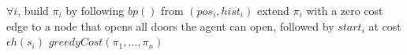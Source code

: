 \documentclass[letterpaper]{article}
\begin{document}
\begin{algorithm}
\caption{$jointPriority((pos_1,hist_1),\ldots,(pos_N,hist_N))$}
\label{alg:update}
\begin{algorithmic}
\STATE $\forall i$, build $\pi_i$ by following $bp()$ from $(pos_i, hist_i)$
\STATE extend $\pi_i$ with a zero cost edge to a node that opens all doors the agent can open, followed by $start_i$ at cost $\epsilon h(s_i)$
\ENDFOR
\RETURN $greedyCost(\pi_1,\ldots,\pi_n)$
\end{algorithmic}
\end{algorithm}



\end{document}

